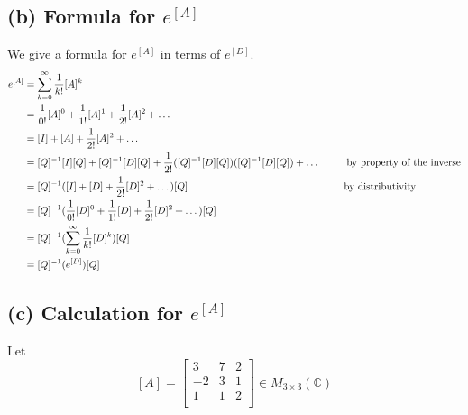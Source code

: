 \documentclass[12pt, letterpaper]{article}
\newcommand{\C}{\mathbb{C}}
\begin{document}
\subsection*{(b) \textmd{Formula for $e^{[A]}$}}

We give a formula for $e^{[A]}$ in terms of $e^{[D]}$.
\begin{align*}
	e^{[A]} &= \sum_{k=0}^\infty \frac{1}{k!} [A]^k \\
		&= \frac{1}{0!}[A]^0 + \frac{1}{1!}[A]^1 + \frac{1}{2!}[A]^2 + \dots \\
		&= [I] + [A] + \frac{1}{2!}[A]^2 + \dots \\
		&= [Q]^{-1}[I][Q] + [Q]^{-1}[D][Q] + \frac{1}{2!}([Q]^{-1}[D][Q])([Q]^{-1}[D][Q]) + \dots  \hspace{2.7em} \text{by property of the inverse}\\
		&= [Q]^{-1}([I] + [D] + \frac{1}{2!}[D]^2 + \dots)[Q]  \hspace{15.5em} \text{by distributivity} \\
		&= [Q]^{-1}(\frac{1}{0!}[D]^0 + \frac{1}{1!}[D] + \frac{1}{2!}[D]^2 + \dots)[Q] \\
		&= [Q]^{-1}(\sum_{k=0}^\infty \frac{1}{k!} [D]^k)[Q] \\
		&= [Q]^{-1}(e^{[D]})[Q]
\end{align*}

\subsection*{(c) \textmd{Calculation for $e^{[A]}$}}

Let $$[A] = \begin{bmatrix}
3 & 7 & 2 \\
-2 & 3 & 1 \\
1 & 1 & 2 \\
\end{bmatrix} \in M_{3\times3}(\C)$$
\end{document}
